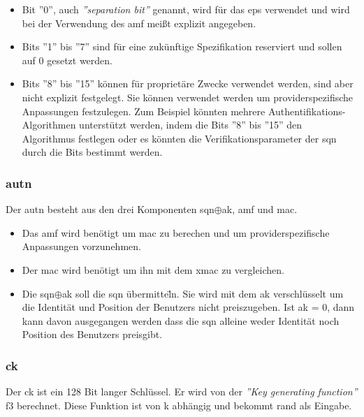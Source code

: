 \begin{itemize}
\item Bit ''0'', auch \textit{''separation bit''} genannt, wird f\"ur das \gls{eps} verwendet und wird bei der Verwendung des \gls{amf} mei{\ss}t explizit angegeben. \\
\item Bits ''1'' bis ''7'' sind f\"ur eine zuk\"unftige Spezifikation reserviert und sollen auf 0 gesetzt werden. \\
\item Bits ''8'' bis ''15'' k\"onnen f\"ur propriet\"are Zwecke verwendet werden, sind aber nicht explizit festgelegt. 
Sie k\"onnen verwendet werden um providerspezifische Anpassungen festzulegen.
Zum Beispiel k\"onnten mehrere Authentifikations-Algorithmen unterst\"utzt werden, indem die Bits ''8'' bis ''15'' den Algorithmus festlegen oder es k\"onnten die Verifikationsparameter der \gls{sqn} durch die Bits bestimmt werden. %
\end{itemize}

\subsubsection{\gls{autn}}
Der \gls{autn} besteht aus den drei Komponenten \gls{sqn}$ \oplus $\gls{ak}, \gls{amf} und \gls{mac}.

\begin{itemize}
\item Das \gls{amf} wird ben\"otigt um \gls{mac} zu berechen und um providerspezifische Anpassungen vorzunehmen.
\item Der \gls{mac} wird ben\"otigt um ihn mit dem \gls{xmac} zu vergleichen.
\item Die \gls{sqn}$ \oplus $\gls{ak} soll die \gls{sqn} \"ubermitte\"ln.
Sie wird mit dem \gls{ak} verschl\"usselt um die Identit\"at und Position der Benutzers nicht preiszugeben.
Ist \gls{ak} = 0, dann kann davon ausgegangen werden dass die \gls{sqn} alleine weder Identit\"at noch Position des Benutzers preisgibt.
\end{itemize}

\subsubsection{\gls{ck}}
Der \gls{ck} ist ein 128 Bit langer Schl\"ussel. %
Er wird von der \textit{''Key generating function''} f3 berechnet.
Diese Funktion ist von \gls{k} abh\"angig und bekommt \gls{rand} als Eingabe. %

